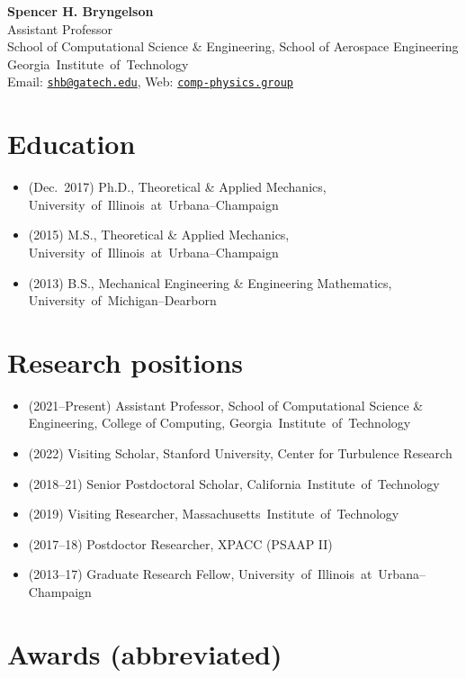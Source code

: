 \documentclass[10pt]{article}
\newcommand\GIT{\mbox{Georgia Institute of Technology}\xspace}
\newcommand\CIT{\mbox{California Institute of Technology}\xspace}
\newcommand\MIT{\mbox{Massachusetts Institute of Technology}\xspace}
\newcommand\UIUC{\mbox{University of Illinois at Urbana--Champaign}\xspace}
\newcommand\UMD{\mbox{University of Michigan--Dearborn}\xspace}
\begin{document}
\begin{center}
    {\Large \bf Spencer H. Bryngelson} \\ \smallskip
    Assistant Professor \\ 
    School of Computational Science \& Engineering, School of Aerospace Engineering \\ \GIT \\ \smallskip
    Email: \href{mailto:shb@gatech.edu}{\texttt{shb@gatech.edu}}, Web:
    \href{https://comp-physics.group}{\texttt{comp-physics.group}}
\end{center}

\section*{Education}

\begin{itemize}
    \item (Dec.\ 2017) Ph.D., Theoretical \& Applied Mechanics, \UIUC
    \item (2015) M.S., Theoretical \& Applied Mechanics, \UIUC
    \item (2013) B.S., Mechanical Engineering \& Engineering Mathematics, \UMD
\end{itemize}


\section*{Research positions}

\begin{itemize}
    \item (2021--Present) Assistant Professor, School of Computational Science \& Engineering, College of Computing, \GIT
    \item (2022) Visiting Scholar, Stanford University, Center for Turbulence Research
    \item (2018--21) Senior Postdoctoral Scholar, \CIT
    \item (2019) Visiting Researcher, \MIT
    \item (2017--18) Postdoctor Researcher, XPACC (PSAAP II)
    \item (2013--17) Graduate Research Fellow, \UIUC
\end{itemize}

\section*{Awards (abbreviated)}
\end{document}
